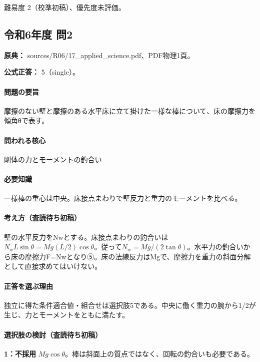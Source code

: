 \par 難易度 2（校準初稿）、優先度未評価。

\subsection{令和6年度 問2}
\label{q:r06-reg-applied-02}

\noindent\textbf{原典：} sources/R06/17\_applied\_science.pdf、PDF物理1頁。

\textbf{公式正答：} 5（single）。

\paragraph{問題の要旨} 摩擦のない壁と摩擦のある水平床に立て掛けた一様な棒について、床の摩擦力を傾角θで表す。

\paragraph{問われる核心} 剛体の力とモーメントの釣合い

\paragraph{必要知識} 一様棒の重心は中央。床接点まわりで壁反力と重力のモーメントを比べる。

\paragraph{考え方（査読待ち初稿）} 壁の水平反力をNwとする。床接点まわりの釣合いは\(N_wL\sin\theta=Mg(L/2)\cos\theta\)。従って\(N_w=Mg/(2\tan\theta)\)。水平力の釣合いから床の摩擦力F=Nwとなり⑤。床の法線反力はMgで、摩擦力を重力の斜面分解として直接求めてはいけない。

\paragraph{正答を選ぶ理由} 独立に得た条件適合値・組合せは選択肢5である。中央に働く重力の腕から1/2が生じ、力とモーメントをともに満たす。

\paragraph{選択肢の検討（査読待ち初稿）}

\noindent\textbf{1：不採用} \(Mg\cos\theta\)。棒は斜面上の質点ではなく、回転の釣合いも必要である。\par


